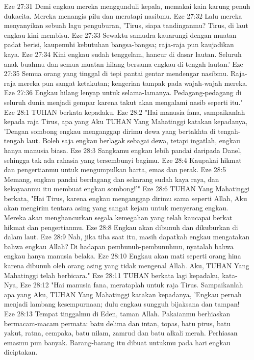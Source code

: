 Eze 27:31  Demi engkau mereka menggunduli kepala, memakai kain karung penuh dukacita. Mereka menangis pilu dan meratapi nasibmu.
Eze 27:32  Lalu mereka menyanyikan sebuah lagu penguburan, 'Tirus, siapa tandinganmu? Tirus, di laut engkau kini membisu.
Eze 27:33  Sewaktu samudra kauarungi dengan muatan padat berisi, kaupenuhi kebutuhan bangsa-bangsa; raja-raja pun kaujadikan kaya.
Eze 27:34  Kini engkau sudah tenggelam, hancur di dasar lautan. Seluruh anak buahmu dan semua muatan hilang bersama engkau di tengah lautan.'
Eze 27:35  Semua orang yang tinggal di tepi pantai gentar mendengar nasibmu. Raja-raja mereka pun sangat ketakutan; kengerian tampak pada wajah-wajah mereka.
Eze 27:36  Engkau hilang lenyap untuk selama-lamanya. Pedagang-pedagang di seluruh dunia menjadi gempar karena takut akan mengalami nasib seperti itu."
Eze 28:1  TUHAN berkata kepadaku,
Eze 28:2  "Hai manusia fana, sampaikanlah kepada raja Tirus, apa yang Aku TUHAN Yang Mahatinggi katakan kepadanya, 'Dengan sombong engkau menganggap dirimu dewa yang bertakhta di tengah-tengah laut. Boleh saja engkau berlagak sebagai dewa, tetapi ingatlah, engkau hanya manusia biasa.
Eze 28:3  Sangkamu engkau lebih pandai daripada Danel, sehingga tak ada rahasia yang tersembunyi bagimu.
Eze 28:4  Kaupakai hikmat dan pengertianmu untuk mengumpulkan harta, emas dan perak.
Eze 28:5  Memang, engkau pandai berdagang dan sekarang sudah kaya raya, dan kekayaanmu itu membuat engkau sombong!'"
Eze 28:6  TUHAN Yang Mahatinggi berkata, "Hai Tirus, karena engkau menganggap dirimu sama seperti Allah, Aku akan mengirim tentara asing yang sangat kejam untuk menyerang engkau. Mereka akan menghancurkan segala kemegahan yang telah kaucapai berkat hikmat dan pengertianmu.
Eze 28:8  Engkau akan dibunuh dan dikuburkan di dalam laut.
Eze 28:9  Nah, jika tiba saat itu, masih dapatkah engkau mengatakan bahwa engkau Allah? Di hadapan pembunuh-pembunuhmu, nyatalah bahwa engkau hanya manusia belaka.
Eze 28:10  Engkau akan mati seperti orang hina karena dibunuh oleh orang asing yang tidak mengenal Allah. Aku, TUHAN Yang Mahatinggi telah berbicara."
Eze 28:11  TUHAN berkata lagi kepadaku, kata-Nya,
Eze 28:12  "Hai manusia fana, merataplah untuk raja Tirus. Sampaikanlah apa yang Aku, TUHAN Yang Mahatinggi katakan kepadanya, 'Engkau pernah menjadi lambang kesempurnaan; dulu engkau sungguh bijaksana dan tampan!
Eze 28:13  Tempat tinggalmu di Eden, taman Allah. Pakaianmu berhiaskan bermacam-macam permata: batu delima dan intan, topas, batu pirus, batu yakut, ratna, cempaka, batu nilam, zamrud dan batu alkali merah. Perhiasan emasmu pun banyak. Barang-barang itu dibuat untukmu pada hari engkau diciptakan.
